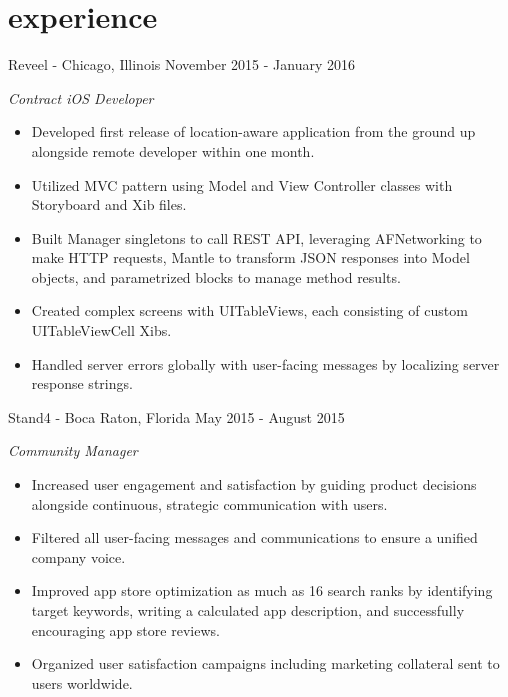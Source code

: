 \documentclass[print]{resume}
\begin{document}
\vspace{-20pt} %

\section{experience}
\begin{entrylist}

\entry
{}
{Reveel \thinfont\footnotesize{}- Chicago, Illinois}
{November 2015 - January 2016}
{
\emph{Contract iOS Developer}
\begin{itemize}
    \item Developed first release of location-aware application from the ground up alongside remote developer within one month. 
    \item Utilized MVC pattern using Model and View Controller classes with Storyboard and Xib files.  
    \item Built Manager singletons to call REST API, leveraging AFNetworking to make HTTP requests, Mantle to transform JSON responses into Model objects, and parametrized blocks to manage method results. 
    \item Created complex screens with UITableViews, each consisting of custom UITableViewCell Xibs.
    \item Handled server errors globally with user-facing messages by localizing server response strings.
\end{itemize} 
}

\entry
{}
{Stand4 \thinfont\footnotesize{}- Boca Raton, Florida}
{May 2015 - August 2015}
{
\emph{Community Manager}
\begin{itemize}
    \item Increased user engagement and satisfaction by guiding product decisions alongside continuous, strategic communication with users.
    \item Filtered all user-facing messages and communications to ensure a unified company voice.  
    \item Improved app store optimization as much as 16 search ranks by identifying target keywords, writing a calculated app description, and successfully encouraging app store reviews.
    \item Organized user satisfaction campaigns including marketing collateral sent to users worldwide.
\end{itemize}
}


\end{entrylist}
\end{document}
